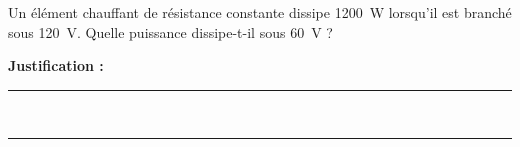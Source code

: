 Un élément chauffant de résistance constante dissipe \qty{1200}{W} lorsqu'il est branché sous \qty{120}{V}. Quelle puissance dissipe-t-il sous \qty{60}{V} ?

\choices

\noindent\textbf{Justification :} \hrulefill \\[2.5ex]
\rule{\linewidth}{0.4pt} \\[2.5ex]
\rule{\linewidth}{0.4pt}
\vfill
